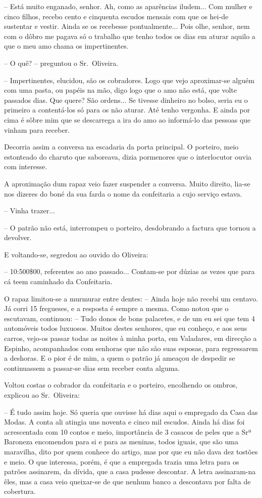 \documentclass[9pt]{article}
\begin{document}
-- Está muito enganado, senhor. Ah, como as aparências iludem... Com
mu\-lher e cinco fi\-lhos, recebo cento e cinquenta escudos mensais com que os
hei-de sustentar e vestir. Ainda se os recebesse pontualmente...  Pois o\-lhe,
senhor, nem com o dôbro me pagava só o traba\-lho que tenho todos os dias em
aturar aquilo a que o meu amo chama os impertinentes.

-- O quê? -- preguntou o Sr.\ Oliveira.

-- Impertinentes, elucidou, são os cobradores. Logo que vejo a\-pro\-xi\-mar-se
alguém com uma pasta, ou papéis na mão, digo logo que o amo não está, que volte
passados dias. Que quere? São ordens...  Se tivesse dinheiro no bolso, seria
eu o primeiro a contentá-los só para os não aturar. Até tenho vergonha. E
ainda por cima é sôbre mim que se descarrega a ira do amo ao informá-lo
das pessoas que vinham para receber.

Decorria assim a conversa na escadaria da porta principal. O porteiro,
meio estonteado do charuto que saboreava, dizia pormenores que o interlocutor ouvia com interesse.

A aproxima\-ção dum rapaz veio fazer suspender a conversa. Muito direito,
lia-se nos dizeres do boné da sua farda o nome da confeitaria a cujo serviço
estava.

-- Vinha trazer...

-- O patrão não está, interrompeu o porteiro, desdobrando a factura que
tornou a devolver.

E voltando-se, segredou ao ouvido do Oliveira:

-- 10:500\$00, referentes ao ano passado... Contam-se por dúzias as vezes que
para cá teem caminhado da Confeitaria.

O rapaz limitou-se a murmurar entre dentes: -- Ainda hoje não recebi um
centavo. Já corri 15 fregueses, e a resposta é sempre a mesma. Como notou
que o escutavam, continuou: -- Tudo donos de bons palacetes, e de um eu sei que
tem 4 automóveis todos luxuosos. Muitos destes senhores, que eu conheço, e aos
seus carros, vejo-os passar todas as noites à minha porta, em Valadares, em
direc\-ção a Espinho, acompanhados com senhoras que não são suas esposas, para
regressarem a deshoras. E o pior é de mim, a quem o patrão já ameaçou de despedir se continuassem a passar-se dias sem receber conta alguma.

Voltou costas o cobrador da confeitaria e o porteiro, enco\-lhendo os
ombros, explicou ao Sr.\ Oliveira:

-- É tudo assim hoje. Só queria que ouvisse há dias aqui o empregado da
Casa das Modas. A conta ali atingia uns noventa e cinco mil escudos. Ainda
há dias foi acrescentada com 10 contos e meio, importância de 3 casacos de peles que a Srª Baroneza encomendou para si e para as meninas, todos
iguais, que são uma maravi\-lha, dito por quem conhece do artigo, mas por que
eu não dava dez tostões e meio. O que interessa, porém, é que a empregada trazia uma letra para os patrões assinarem, da dívida, que a casa pudesse
descontar. A letra assinaram-na êles, mas a casa veio queixar-se de que nenhum banco a descontava por falta de cobertura.
\end{document}
